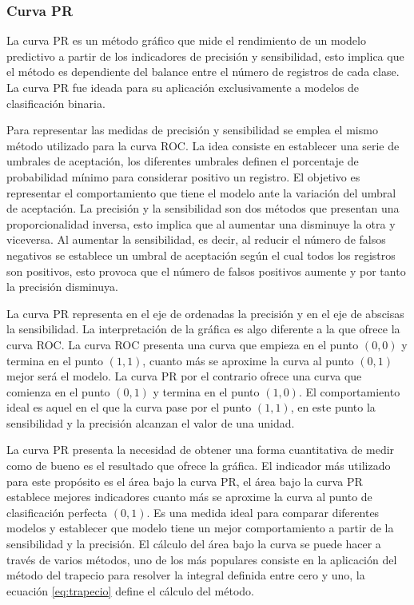 \subsubsection{Curva PR}

La curva PR es un método gráfico que mide el rendimiento de un modelo predictivo a partir de los indicadores de precisión y sensibilidad, esto implica que el método es dependiente del balance entre el número de registros de cada clase. La curva PR fue ideada para su aplicación exclusivamente a modelos de clasificación binaria.

\bigbreak

Para representar las medidas de precisión y sensibilidad se emplea el mismo método utilizado para la curva ROC. La idea consiste en establecer una serie de umbrales de aceptación, los diferentes umbrales definen el porcentaje de probabilidad mínimo para considerar positivo un registro. El objetivo es representar el comportamiento que tiene el modelo ante la variación del umbral de aceptación. La precisión y la sensibilidad son dos métodos que presentan una proporcionalidad inversa, esto implica que al aumentar una disminuye la otra y viceversa. Al aumentar la sensibilidad, es decir, al reducir el número de falsos negativos se establece un umbral de aceptación según el cual todos los registros son positivos, esto provoca que el número de falsos positivos aumente y por tanto la precisión disminuya.

\bigbreak


La curva PR representa en el eje de ordenadas la precisión y en el eje de abscisas la sensibilidad. La interpretación de la gráfica es algo diferente a la que ofrece la curva ROC. La curva ROC presenta una curva que empieza en el punto $(0, 0)$ y termina en el punto $(1, 1)$, cuanto más se aproxime la curva al punto $(0, 1)$ mejor será el modelo. La curva PR por el contrario ofrece una curva que comienza en el punto $(0, 1)$ y termina en el punto $(1, 0)$. El comportamiento ideal es aquel en el que la curva pase por el punto $(1, 1)$, en este punto la sensibilidad y la precisión alcanzan el valor de una unidad.

\bigbreak

La curva PR presenta la necesidad de obtener una forma cuantitativa de medir como de bueno es el resultado que ofrece la gráfica. El indicador más utilizado para este propósito es el área bajo la curva PR, el área bajo la curva PR establece mejores indicadores cuanto más se aproxime la curva al punto de clasificación perfecta $(0, 1)$. Es una medida ideal para comparar diferentes modelos y establecer que modelo tiene un mejor comportamiento a partir de la sensibilidad y la precisión. El cálculo del área bajo la curva se puede hacer a través de varios métodos, uno de los más populares consiste en la aplicación del método del trapecio para resolver la integral definida entre cero y uno, la ecuación \ref{eq:trapecio} define el cálculo del método.

